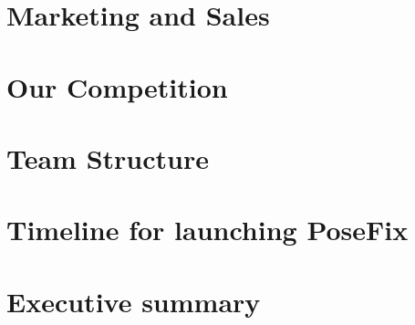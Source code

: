 \documentclass[a4paper, 11pt]{report}
\begin{document}
	{
		\FloatBarrier
		\chapter{Marketing and Sales}
		\label{chp:marketing}
		
	}

	{
		\FloatBarrier
		\chapter{Our Competition}
		\label{chp:competition}
		
	}

	{
		\FloatBarrier
		\chapter{Team Structure}
		\label{chp:team_structure}
		
	}

	{
		\FloatBarrier
		\chapter{Timeline for launching PoseFix}
		\label{chp:timeline}
		
	}

	{
		\FloatBarrier
		\chapter{Executive summary}
		\label{chp:summary}
		
	}

	{
		\FloatBarrier
		\newpage
		\printbibliography[title = References]
	}
\end{document}
